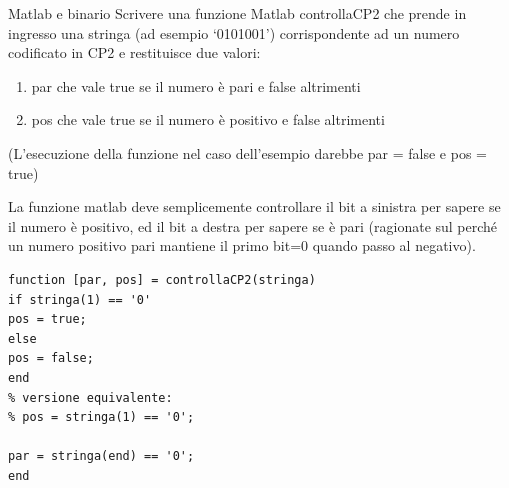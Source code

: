 \documentclass[format=169, 10pt, handout]{beamer}
\begin{document}
\iffalse
\begin{frame}[fragile]{Matlab e binario}
\framebreak
Scrivere  una  funzione  Matlab  controllaCP2  che  prende  in  ingresso  una  stringa  (ad  
esempio ‘0101001’)  corrispondente  ad  un  numero  codificato  in  CP2  e  restituisce  due  
valori: 
\begin{enumerate}
	\item par  che  vale  true  se  il  numero  è  pari  e  false  altrimenti  
	\item    pos  che  vale  true  se  il  numero  è  positivo  e  false  altrimenti  
\end{enumerate}
(L’esecuzione  della  funzione  nel  caso  dell’esempio  darebbe  par = false  e  pos =
true)


\framebreak

La funzione matlab deve semplicemente controllare il bit a sinistra per sapere se il numero è positivo, ed il bit a destra per sapere se è pari (ragionate sul perché un numero positivo pari mantiene il primo bit=0 quando passo al negativo).
\begin{lstlisting}[style=matlab]
function [par, pos] = controllaCP2(stringa)
if stringa(1) == '0'
pos = true;
else
pos = false;
end
% versione equivalente:
% pos = stringa(1) == '0';

par = stringa(end) == '0';
end
\end{lstlisting}


\end{frame}
\end{document}
